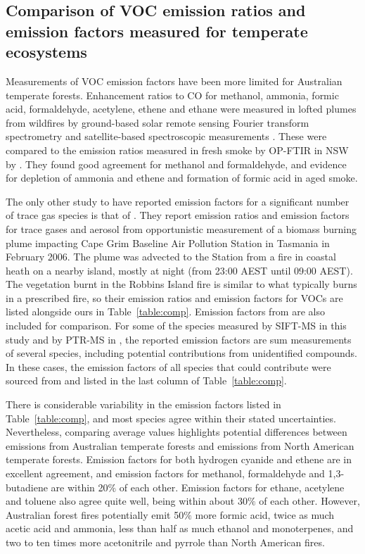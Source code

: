 \documentclass[acp, manuscript]{copernicus}
\begin{document}
\subsection{Comparison of VOC emission ratios and emission factors measured for temperate ecosystems}
Measurements of VOC emission factors have been more limited for Australian temperate forests. Enhancement ratios to CO for methanol, ammonia, formic acid, formaldehyde, acetylene, ethene and ethane were measured in lofted plumes from wildfires by ground-based solar remote sensing Fourier transform spectrometry \citep{Paton-Walsh2005, Paton-Walsh2008} and satellite-based spectroscopic measurements \citep{Young2011,Glatthor2013}. These were compared to the emission ratios measured in fresh smoke by OP-FTIR in NSW by \citet{Paton-Walsh2014}. They found good agreement for methanol and formaldehyde, and evidence for depletion of ammonia and ethene and formation of formic acid in aged smoke. 
 
The only other study to have reported emission factors for a significant number of trace gas species is that of \citet{Lawson2015}. They report emission ratios and emission factors for trace gases and aerosol from opportunistic measurement of a biomass burning plume impacting Cape Grim Baseline Air Pollution Station in Tasmania in February 2006. The plume was advected to the Station from a fire in coastal heath on a nearby island, mostly at night (from 23:00 AEST until 09:00 AEST). The vegetation burnt in the Robbins Island fire is similar to what typically burns in a prescribed fire, so their emission ratios and emission factors for VOCs are listed alongside ours in Table~\ref{table:comp}. Emission factors from  \citet[Table S4, February 2015 update]{Akagi2011} are also included for comparison. For some of the species measured by SIFT-MS in this study and by PTR-MS in \citet{Lawson2015}, the reported emission factors are sum measurements of several species, including potential contributions from unidentified compounds. In these cases, the emission factors of all species that could contribute were sourced from \citet[Table S4, February 2015 update]{Akagi2011} and listed in the last column of Table~\ref{table:comp}. 

There is considerable variability in the emission factors listed in Table~\ref{table:comp}, and most species agree within their stated uncertainties. Nevertheless, comparing average values highlights potential differences between emissions from Australian temperate forests and emissions from North American temperate forests. Emission  factors for both hydrogen cyanide and ethene are in excellent agreement, and emission factors for methanol, formaldehyde and 1,3-butadiene are within 20$\%$ of each other. Emission factors for ethane, acetylene and toluene also agree quite well, being within about 30$\%$ of each other. However, Australian forest fires potentially emit 50$\%$ more formic acid, twice as much acetic acid and ammonia, less than half as much ethanol and monoterpenes, and two to ten times more acetonitrile and pyrrole than North American fires. 
\end{document}

